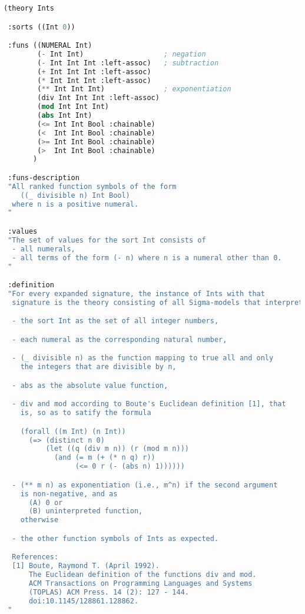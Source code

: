 \documentclass{article}
\begin{document}
\begin{lstlisting}[language=Lisp]
(theory Ints

 :sorts ((Int 0))

 :funs ((NUMERAL Int)
        (- Int Int)                   ; negation
        (- Int Int Int :left-assoc)   ; subtraction
        (+ Int Int Int :left-assoc)
        (* Int Int Int :left-assoc)
        (** Int Int Int)              ; exponentiation
        (div Int Int Int :left-assoc)
        (mod Int Int Int)
        (abs Int Int)
        (<= Int Int Bool :chainable)
        (<  Int Int Bool :chainable)
        (>= Int Int Bool :chainable)
        (>  Int Int Bool :chainable)
       )

 :funs-description
 "All ranked function symbols of the form
    ((_ divisible n) Int Bool)
  where n is a positive numeral.
 "

 :values
 "The set of values for the sort Int consists of
  - all numerals,
  - all terms of the form (- n) where n is a numeral other than 0.
 "

 :definition
 "For every expanded signature, the instance of Ints with that
  signature is the theory consisting of all Sigma-models that interpret:

  - the sort Int as the set of all integer numbers,

  - each numeral as the corresponding natural number,

  - (_ divisible n) as the function mapping to true all and only
    the integers that are divisible by n,

  - abs as the absolute value function,

  - div and mod according to Boute's Euclidean definition [1], that
    is, so as to satify the formula

    (forall ((m Int) (n Int))
      (=> (distinct n 0)
          (let ((q (div m n)) (r (mod m n)))
            (and (= m (+ (* n q) r))
                 (<= 0 r (- (abs n) 1))))))

  - (** m n) as exponentiation (i.e., m^n) if the second argument
    is non-negative, and as
      (A) 0 or
      (B) uninterpreted function,
    otherwise

  - the other function symbols of Ints as expected.

  References:
  [1] Boute, Raymond T. (April 1992).
      The Euclidean definition of the functions div and mod.
      ACM Transactions on Programming Languages and Systems
      (TOPLAS) ACM Press. 14 (2): 127 - 144.
      doi:10.1145/128861.128862.
 "


\end{lstlisting}
\end{document}
